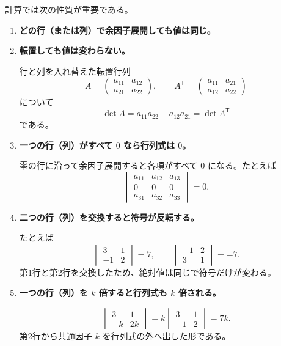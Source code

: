 計算では次の性質が重要である。
\begin{enumerate}
 \item \textbf{どの行（または列）で余因子展開しても値は同じ。}

 \item \textbf{転置しても値は変わらない。}

  行と列を入れ替えた転置行列
  \[
   A=\begin{pmatrix}a_{11}&a_{12}\\a_{21}&a_{22}\end{pmatrix},
   \qquad
   A^{\mathsf T}=\begin{pmatrix}a_{11}&a_{21}\\a_{12}&a_{22}\end{pmatrix}
  \]
  について
  \[
   \det A=a_{11}a_{22}-a_{12}a_{21}
   =\det A^{\mathsf T}
  \]
  である。

 \item \textbf{一つの行（列）がすべて $0$ なら行列式は $0$。}

  零の行に沿って余因子展開すると各項がすべて $0$ になる。たとえば
  \[
   \begin{vmatrix}
    a_{11}&a_{12}&a_{13}\\
    0&0&0\\
    a_{31}&a_{32}&a_{33}
   \end{vmatrix}=0.
  \]

 \item \textbf{二つの行（列）を交換すると符号が反転する。}

  たとえば
  \[
   \begin{vmatrix}3&1\\-1&2\end{vmatrix}=7,\qquad
   \begin{vmatrix}-1&2\\3&1\end{vmatrix}=-7.
  \]
  第1行と第2行を交換したため、絶対値は同じで符号だけが変わる。

 \item \textbf{一つの行（列）を $k$ 倍すると行列式も $k$ 倍される。}

  \[
   \begin{vmatrix}3&1\\-k&2k\end{vmatrix}
   =k\begin{vmatrix}3&1\\-1&2\end{vmatrix}=7k.
  \]
  第2行から共通因子 $k$ を行列式の外へ出した形である。


\end{enumerate}
